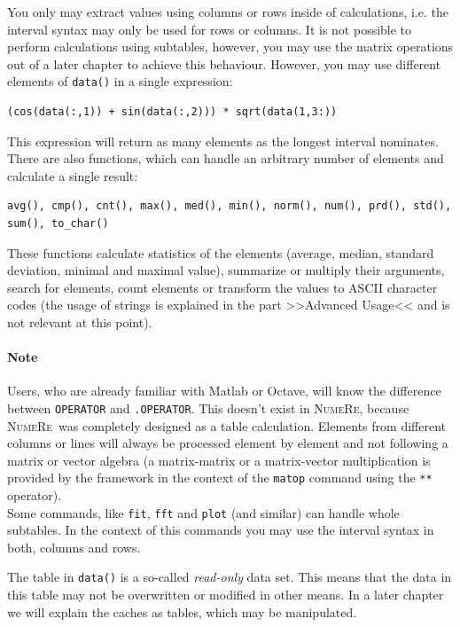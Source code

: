 \documentclass[DIV=14,headsepline,footsepline]{scrbook}
\newcommand{\NR}{\textsc{Nu\-me\-Re}}
\begin{document}
				You only may extract values using columns or rows inside of calculations, i.e. the interval syntax may only be used for rows or columns. It is not possible to perform calculations using subtables, however, you may use the matrix operations out of a later chapter to achieve this behaviour. However, you may use different elements of \verb+data()+ in a single expression:
				\begin{lstlisting}
(cos(data(:,1)) + sin(data(:,2))) * sqrt(data(1,3:))
				\end{lstlisting}
				This expression will return as many elements as the longest interval nominates. There are also functions, which can handle an arbitrary number of elements and calculate a single result:
				\begin{lstlisting}
avg(), cmp(), cnt(), max(), med(), min(), norm(), num(), prd(), std(), sum(), to_char()
				\end{lstlisting}
				These functions calculate statistics of the elements (average, median, standard deviation, minimal and maximal value), summarize or multiply their arguments, search for elements, count elements or transform the values to ASCII character codes (the usage of strings is explained in the part >>Advanced Usage<< and is not relevant at this point).
				
				\paragraph{Note}
					Users, who are already familiar with Matlab or Octave, will know the difference between \verb+OPERATOR+ and \verb+.OPERATOR+. This doesn't exist in \NR, because \NR\ was completely designed as a table calculation. Elements from different columns or lines will always be processed element by element and not following a matrix or vector algebra (a matrix-matrix or a matrix-vector multiplication is provided by the framework in the context of the \verb+matop+ command using the \verb+**+ operator).\bigskip\\
				Some commands, like \verb+fit+, \verb+fft+ and \verb+plot+ (and similar) can handle whole subtables. In the context of this commands you may use the interval syntax in both, columns and rows.
				
				The table in \verb+data()+ is a so-called \emph{read-only} data set. This means that the data in this table may not be overwritten or modified in other means. In a later chapter we will explain the caches as tables, which may be manipulated.
				
\end{document}
